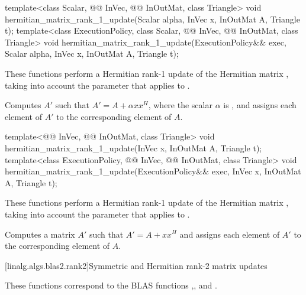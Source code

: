 %
\begin{itemdecl}
template<class Scalar, @@ InVec, @@ InOutMat, class Triangle>
  void hermitian_matrix_rank_1_update(Scalar alpha, InVec x, InOutMat A, Triangle t);
template<class ExecutionPolicy,
         class Scalar, @@ InVec, @@ InOutMat, class Triangle>
  void hermitian_matrix_rank_1_update(ExecutionPolicy&& exec,
                                      Scalar alpha, InVec x, InOutMat A, Triangle t);
\end{itemdecl}

\begin{itemdescr}
\pnum
These functions perform
a Hermitian rank-1 update of the Hermitian matrix ,
taking into account the  parameter
that applies to .

\pnum
\effects
Computes $A'$ such that
$A' = A + \alpha x x^H$, where the scalar $\alpha$ is ,
and assigns each element of $A'$ to the corresponding element of $A$.
\end{itemdescr}

%
\begin{itemdecl}
template<@@ InVec, @@ InOutMat, class Triangle>
  void hermitian_matrix_rank_1_update(InVec x, InOutMat A, Triangle t);
template<class ExecutionPolicy,
         @@ InVec, @@ InOutMat, class Triangle>
  void hermitian_matrix_rank_1_update(ExecutionPolicy&& exec, InVec x, InOutMat A, Triangle t);
\end{itemdecl}

\begin{itemdescr}
\pnum
These functions perform
a Hermitian rank-1 update of the Hermitian matrix ,
taking into account the  parameter
that applies to .

\pnum
\effects
Computes a matrix $A'$ such that $A' = A + x x^H$ and
assigns each element of $A'$ to the corresponding element of $A$.
\end{itemdescr}

[linalg.algs.blas2.rank2]{Symmetric and Hermitian rank-2 matrix updates}

\pnum
\begin{note}
These functions correspond to the BLAS functions
,,  and \supercite{blas2}.
\end{note}

